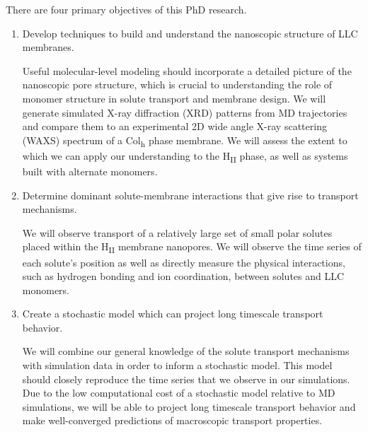\documentclass{article}
\begin{document}
  \noindent There are four primary objectives of this PhD research.
  \begin{enumerate}
  
    \item Develop techniques to build and understand the nanoscopic structure
    of LLC membranes.


    Useful molecular-level modeling should incorporate a detailed picture 
    of the nanoscopic pore structure, which is crucial to understanding
    the role of monomer structure in solute transport and membrane design.
    We will generate simulated X-ray diffraction (XRD) patterns from MD trajectories
    and compare them to an experimental 2D wide angle X-ray scattering (WAXS)
    spectrum of a Col\textsubscript{h} phase membrane. We will assess the extent
    to which we can apply our understanding to the H\textsubscript{II} phase,
    as well as systems built with alternate monomers.
    
    \item Determine dominant solute-membrane interactions that give rise to
    transport mechanisms.
    
    We will observe transport of a relatively large set of small polar solutes
    placed within the H\textsubscript{II} membrane nanopores. We will observe
    the time series of each solute's position as well as directly measure the
    physical interactions, such as hydrogen bonding and ion coordination, 
    between solutes and LLC monomers.
    
    \item Create a stochastic model which can project long timescale 
    transport behavior.
    
    We will combine our general knowledge of the solute transport mechanisms
    with simulation data in order to inform a stochastic model. This model
    should closely reproduce the time series that we observe in our simulations.
    Due to the low computational cost of a stochastic model relative to 
    MD simulations, we will be able to project long timescale transport behavior
    and make well-converged predictions of macroscopic transport properties.
           

\end{enumerate}
\end{document}
